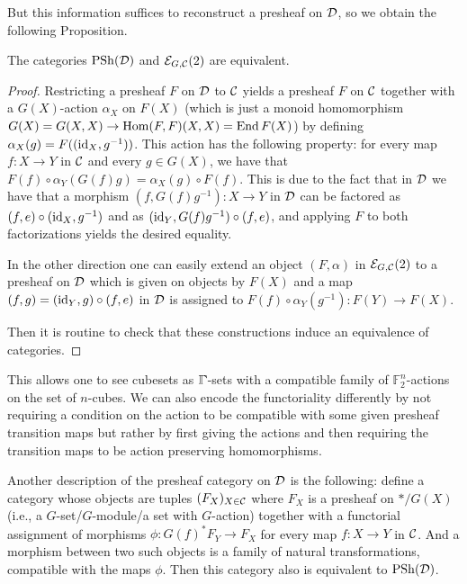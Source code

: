 But this information suffices to reconstruct a presheaf on $\mathcal{D}$, so we obtain the following Proposition.

\begin{proposition}\label{prop:unstrait-presehaf}
The categories $\operatorname{PSh}(\mathcal{D})$ and $\mathcal{E}_{G,\mathcal{C}}(2)$ are equivalent.
\end{proposition}

\begin{proof}
Restricting a presheaf $F$ on $\mathcal{D}$ to $\mathcal{C}$
yields a presheaf $F$ on $\mathcal{C}$ together with a $G(X)$-action $\alpha_X$ on $F(X)$
(which is just a monoid homomorphism $G(X)=G(X,X)\to \operatorname{Hom}(F,F)(X,X) = \operatorname{End} F(X)$) by defining $\alpha_X(g)=F((\operatorname{id}_X, g^{-1}))$.
This action has the following property:
for every map $f\colon X\to Y$ in $\mathcal{C}$ and every $g\in G(X)$, we have that
$F(f)\circ\alpha_Y(G(f)g) = \alpha_X(g)\circ F(f)$.
This is due to the fact that in $\mathcal{D}$ we have that a morphism $(f,G(f)g^{-1})\colon X\to Y$ in $\mathcal{D}$
can be factored as $(f,e)\circ (\operatorname{id}_X,g^{-1})$ and as $(\operatorname{id}_Y,G(f)g^{-1})\circ (f,e)$,
and applying $F$ to both factorizations yields the desired equality.

In the other direction one can easily extend an object $(F,\alpha)$ in $\mathcal{E}_{G,\mathcal{C}}(2)$ to a presheaf on $\mathcal{D}$
which is given on objects by $F(X)$ and a map $(f,g) = (\operatorname{id}_Y,g)\circ (f,e)$ in $\mathcal{D}$
is assigned to $F(f)\circ \alpha_Y(g^{-1})\colon F(Y)\to F(X)$.

Then it is routine to check that these constructions induce an equivalence of categories.
\end{proof}

This allows one to see cubesets as $\bbGamma$-sets with a compatible family of $\mathbb{F}_2^n$-actions on the set of $n$-cubes.
We can also encode the functoriality differently by not requiring a condition on the action to be compatible with some given presheaf transition maps
but rather by first giving the actions and then requiring the transition maps to be action preserving homomorphisms.

\begin{remark}
Another description of the presheaf category on $\mathcal{D}$ is the following:
define a category whose objects are tuples
$(F_X)_{X\in\mathcal{C}}$ where $F_X$ is a presheaf on $*/G(X)$ (i.e., a $G$-set/$G$-module/a set with $G$-action) together with a functorial assignment of morphisms
$\phi\colon G(f)^\ast F_Y\to F_X$ for every map $f\colon X\to Y$ in $\mathcal{C}$.
And a morphism between two such objects is a family of natural transformations,
compatible with the maps $\phi$.
Then this category also is equivalent to $\operatorname{PSh}(\mathcal{D})$.
\end{remark}


